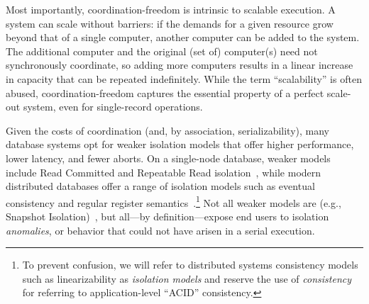 

 Most importantly,
coordination-freedom is intrinsic to scalable execution. A \cfree
system can scale without barriers: if the demands for a given resource
grow beyond that of a single computer, another computer can be added
to the system. The additional computer and the original (set of)
computer(s) need not synchronously coordinate, so adding more
computers results in a linear increase in capacity that can be
repeated indefinitely. While the term ``scalability'' is often abused,
coordination-freedom captures the essential property of a perfect
scale-out system, even for single-record operations.


 Given the costs of coordination (and, by
association, serializability), many database systems opt for weaker
isolation models that offer higher performance, lower latency, and
fewer aborts. On a single-node database, weaker models include Read
Committed and Repeatable Read isolation~\cite{adya-isolation}, while
modern distributed databases offer a range of isolation models such as
eventual consistency and regular register
semantics~\cite{hat-vldb}.\footnote{To prevent confusion, we will
  refer to distributed systems consistency models such as
  linearizability as \textit{isolation models} and reserve the use of
  \textit{consistency} for referring to application-level ``ACID''
  consistency.}  Not all weaker models are \cfree (e.g., Snapshot
Isolation)~\cite{hat-vldb}, but all---by definition---expose end users
to isolation \textit{anomalies}, or behavior that could not have
arisen in a serial execution.

